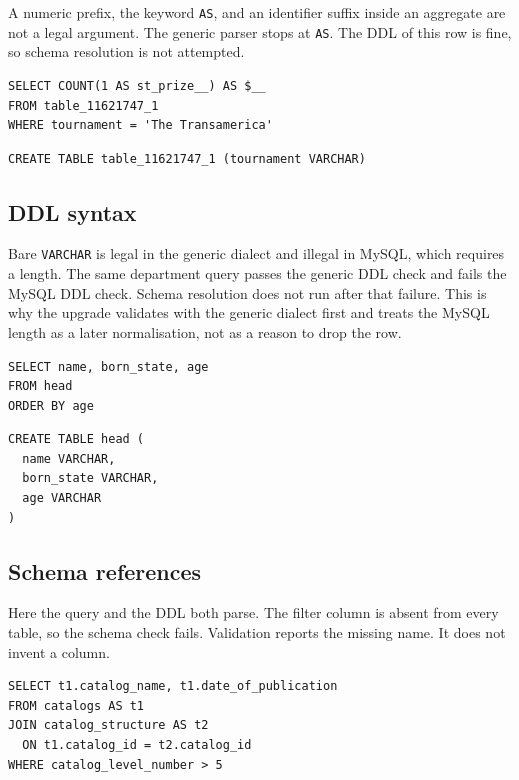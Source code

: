 \documentclass[11pt,a4paper]{article}
\begin{document}
A numeric prefix, the keyword \texttt{AS}, and an identifier suffix inside an
aggregate are not a legal argument. The generic parser stops at \texttt{AS}.
The DDL of this row is fine, so schema resolution is not attempted.

\begin{lstlisting}[caption={Invalid SQL. The aggregate argument is not an expression.}]
SELECT COUNT(1 AS st_prize__) AS $__
FROM table_11621747_1
WHERE tournament = 'The Transamerica'
\end{lstlisting}

\begin{lstlisting}[caption={DDL for the same row. Generic syntax accepts bare VARCHAR.}]
CREATE TABLE table_11621747_1 (tournament VARCHAR)
\end{lstlisting}

\subsection{DDL syntax}

Bare \texttt{VARCHAR} is legal in the generic dialect and illegal in MySQL,
which requires a length. The same department query passes the generic DDL
check and fails the MySQL DDL check. Schema resolution does not run after
that failure. This is why the upgrade validates with the generic dialect
first and treats the MySQL length as a later normalisation, not as a reason
to drop the row.

\begin{lstlisting}[caption={Query that is syntactically valid in both dialects.}]
SELECT name, born_state, age
FROM head
ORDER BY age
\end{lstlisting}

\begin{lstlisting}[caption={DDL rejected by MySQL: VARCHAR needs a length.}]
CREATE TABLE head (
  name VARCHAR,
  born_state VARCHAR,
  age VARCHAR
)
\end{lstlisting}

\subsection{Schema references}

Here the query and the DDL both parse. The filter column is absent from every
table, so the schema check fails. Validation reports the missing name. It does
not invent a column.

\begin{lstlisting}[caption={Valid SQL that names a column the DDL does not define.}]
SELECT t1.catalog_name, t1.date_of_publication
FROM catalogs AS t1
JOIN catalog_structure AS t2
  ON t1.catalog_id = t2.catalog_id
WHERE catalog_level_number > 5
\end{lstlisting}
\end{document}
